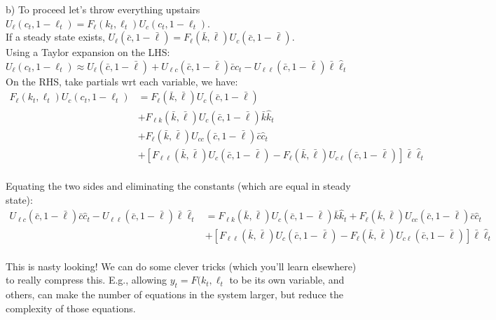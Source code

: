 \documentclass[12pt]{article}
\begin{document}
\begin{enumerate}[1.]
b) To proceed let's throw everything upstairs $U_{\ell}(c_{t}, 1-\ell_{t}) = F_{\ell}(k_{t}, \ell_{t})U_{c}(c_{t}, 1-\ell_{t})$. \\

If a steady state exists, $U_{\ell}(\bar{c}, 1-\bar{\ell}) = F_{\ell}(\bar{k}, \bar{\ell})U_{c}(\bar{c}, 1-\bar{\ell})$.\\

Using a Taylor expansion on the LHS:\\

$U_{\ell}(c_{t}, 1-\ell_{t}) \approx U_{\ell}(\bar{c}, 1-\bar{\ell}) + U_{\ell c}(\bar{c}, 1-\bar{\ell})\bar{c}\hat{c}_{t} - U_{\ell \ell}(\bar{c}, 1-\bar{\ell}) \bar{\ell} \hat{\ell}_{t}$ \\

On the RHS, take partials wrt each variable, we have:\\

\begin{align*}
F_{\ell}(k_{t}, \ell_{t})U_{c}(c_{t}, 1-\ell_{t}) & = F_{\ell}(\bar{k}, \bar{\ell}) U_{c}(\bar{c}, 1-\bar{\ell}) \\
& + F_{\ell k}(\bar{k}, \bar{\ell})U_{c}(\bar{c}, 1-\bar{\ell}) \bar{k} \hat{k}_{t}\\
& + F_{\ell}(\bar{k}, \bar{\ell})U_{cc}(\bar{c}, 1-\bar{\ell}) \bar{c} \hat{c}_{t}\\
& +[ F_{\ell \ell}(\bar{k}, \bar{\ell})U_{c}(\bar{c}, 1-\bar{\ell}) -  F_{\ell }(\bar{k}, \bar{\ell})U_{c\ell}(\bar{c}, 1-\bar{\ell}) ] \bar{\ell} \hat{\ell}_{t}\\
\end{align*}

Equating the two sides and eliminating the constants (which are equal in steady state):
\begin{align*}
U_{\ell c}(\bar{c}, 1-\bar{\ell})\bar{c}\hat{c}_{t} - U_{\ell \ell}(\bar{c}, 1-\bar{\ell}) \bar{\ell} \hat{\ell}_{t} &=  F_{\ell k}(\bar{k}, \bar{\ell})U_{c}(\bar{c}, 1-\bar{\ell}) \bar{k} \hat{k}_{t} + F_{\ell}(\bar{k}, \bar{\ell})U_{cc}(\bar{c}, 1-\bar{\ell}) \bar{c} \hat{c}_{t}\\
& +[ F_{\ell \ell}(\bar{k}, \bar{\ell})U_{c}(\bar{c}, 1-\bar{\ell}) -  F_{\ell }(\bar{k}, \bar{\ell})U_{c\ell}(\bar{c}, 1-\bar{\ell}) ] \bar{\ell} \hat{\ell}_{t}\\
\end{align*}

This is nasty looking! We can do some clever tricks (which you'll learn elsewhere) to really compress this. E.g., allowing $y_{t} = F(k_{t}, \ell_{t}$ to be its own variable, and others, can make the number of equations in the system larger, but reduce the complexity of those equations.
\fi


\end{enumerate}
\end{document}
